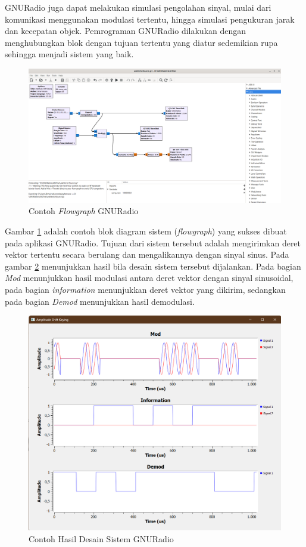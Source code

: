 GNURadio juga dapat melakukan simulasi pengolahan sinyal, mulai dari komunikasi menggunakan modulasi tertentu, hingga simulasi pengukuran jarak dan kecepatan objek. Pemrograman GNURadio dilakukan dengan menghubungkan blok dengan tujuan tertentu yang diatur sedemikian rupa sehingga menjadi sistem yang baik.

\begin{figure}
	\begin{center}
		\includegraphics[scale=0.3]{pics/bab2/blokDiagramGRC.png} 
		\caption[Contoh \textit{Flowgraph} GNURadio]{Contoh \textit{Flowgraph} GNURadio}
		\label{pic:contohFlowGraphGRC}
	\end{center}
\end{figure}

Gambar \ref{pic:contohFlowGraphGRC} adalah contoh blok diagram sistem (\textit{flowgraph}) yang sukses dibuat pada aplikasi GNURadio. Tujuan dari sistem tersebut adalah mengirimkan deret vektor tertentu secara berulang dan mengalikannya dengan sinyal sinus. Pada gambar \ref{pic:contohRunGRC} menunjukkan hasil bila desain sistem tersebut dijalankan. Pada bagian \textit{Mod} menunjukkan hasil modulasi antara deret vektor dengan sinyal sinusoidal, pada bagian \textit{information} menunjukkan deret vektor yang dikirim, sedangkan pada bagian \textit{Demod} menunjukkan hasil demodulasi.

\begin{figure}
	\begin{center}
		\includegraphics[scale=0.4]{pics/bab2/contohRunGRC.png} 
		\caption[Contoh Hasil Desain Sistem GNURadio]{Contoh Hasil Desain Sistem GNURadio}
		\label{pic:contohRunGRC}
	\end{center}
\end{figure}



